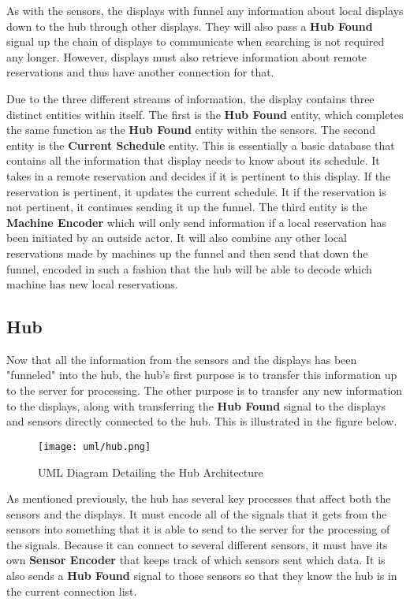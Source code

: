 \documentclass[PPFS.tex]{template/subfiles}
\begin{document}
As with the sensors, the displays with funnel any information about local displays down to the hub through other displays. They will also pass a \textbf{Hub Found} signal up the chain of displays to communicate when searching is not required any longer. However, displays must also retrieve information about remote reservations and thus have another connection for that.

Due to the three different streams of information, the display contains three distinct entities within itself. The first is the \textbf{Hub Found} entity, which completes the same function as the \textbf{Hub Found} entity within the sensors. The second entity is the \textbf{Current Schedule} entity. This is essentially a basic database that contains all the information that display needs to know about its schedule. It takes in a remote reservation and decides if it is pertinent to this display. If the reservation is pertinent, it updates the current schedule. It if the reservation is not pertinent, it continues sending it up the funnel. The third entity is the \textbf{Machine Encoder} which will only send information if a local reservation has been initiated by an outside actor. It will also combine any other local reservations made by machines up the funnel and then send that down the funnel, encoded in such a fashion that the hub will be able to decode which machine has new local reservations.

\subsection{Hub}

Now that all the information from the sensors and the displays has been "funneled" into the hub, the hub's first purpose is to transfer this information up to the server for processing. The other purpose is to transfer any new information to the displays, along with transferring the \textbf{Hub Found} signal to the displays and sensors directly connected to the hub. This is illustrated in the figure below.

\begin{figure}[H]
    \centering
    \texttt{[image: uml/hub.png]}
    \caption{UML Diagram Detailing the Hub Architecture}
\end{figure}

As mentioned previously, the hub has several key processes that affect both the sensors and the displays. It must encode all of the signals that it gets from the sensors into something that it is able to send to the server for the processing of the signals. Because it can connect to several different sensors, it must have its own \textbf{Sensor Encoder} that keeps track of which sensors sent which data. It is also sends a \textbf{Hub Found} signal to those sensors so that they know the hub is in the current connection list.
\end{document}
